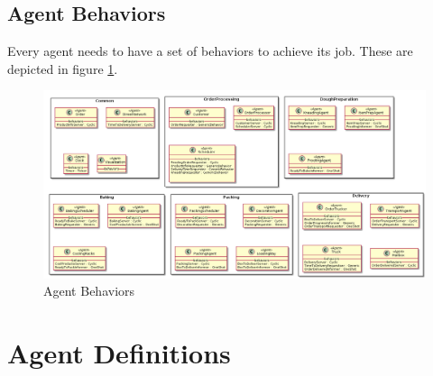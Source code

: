 \documentclass[11pt, a4paper]{article}
\begin{document}
\subsection{Agent Behaviors}
Every agent needs to have a set of behaviors to achieve its job. These are depicted in figure \ref{Agent_Behaviors}.
\begin{figure}[h!]
	\centering
	\includegraphics[scale=0.35]{../Architecture/AgentBehaviors.png}
	\caption{Agent Behaviors}
	\label{Agent_Behaviors}
\end{figure}	

\pagebreak
\section{Agent Definitions}
\end{document}

